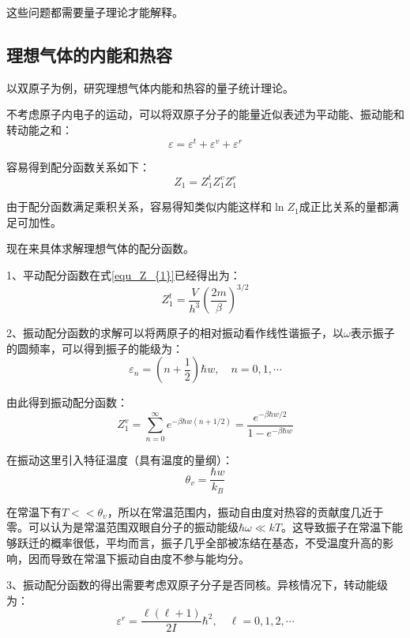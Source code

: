\documentclass[UTF8]{ctexart}
\begin{document}
	这些问题都需要量子理论才能解释。
	
	\subsection{理想气体的内能和热容}
	以双原子为例，研究理想气体内能和热容的量子统计理论。
	
	不考虑原子内电子的运动，可以将双原子分子的能量近似表述为平动能、振动能和转动能之和：
	\begin{equation}
		\varepsilon=\varepsilon^{t}+\varepsilon^{v}+\varepsilon^{r}
	\end{equation}
	
\noindent 容易得到配分函数关系如下：
\begin{equation}
Z_{1}=Z_{1}^{t} Z_{1}^{v} Z_{1}^{r}
\end{equation}

\noindent 由于配分函数满足乘积关系，容易得知类似内能这样和$ \ln Z_{1} $成正比关系的量都满足可加性。

	现在来具体求解理想气体的配分函数。
	
	1、平动配分函数在式\ref{equ_Z_{1}}已经得出为：
	$$
	Z_{1}^{t}=\frac{V}{h^{3}}\left(\frac{2 m}{\beta}\right)^{3 / 2}
	$$
	
	2、振动配分函数的求解可以将两原子的相对振动看作线性谐振子，以$ \omega $表示振子的圆频率，可以得到振子的能级为：
	\begin{equation}
	\varepsilon_{n}=\left(n+\frac{1}{2}\right) \hbar w, \quad n=0,1, \cdots
	\end{equation}
	
\noindent 由此得到振动配分函数：
\begin{equation}
Z_{1}^{v}=\sum_{n=0}^{\infty} e^{-\beta \hbar w(n+1 / 2)}=\frac{e^{-\beta \hbar w / 2}}{1-e^{-\beta \hbar w}}
\end{equation}

	在振动这里引入特征温度（具有温度的量纲）：
	\begin{equation}
	\theta_{v}=\frac{\hbar w}{k_{B}}
	\end{equation}
	
	在常温下有$ T<<\theta_{v} $，所以在常温范围内，振动自由度对热容的贡献度几近于零。可以认为是常温范围双眼自分子的振动能级$ \hbar \omega \ll k T $。这导致振子在常温下能够跃迁的概率很低，平均而言，振子几乎全部被冻结在基态，不受温度升高的影响，因而导致在常温下振动自由度不参与能均分。
	
	3、振动配分函数的得出需要考虑双原子分子是否同核。异核情况下，转动能级为：
	\begin{equation}
	\varepsilon^{r}=\frac{\ell(\ell+1)}{2 I} \hbar^{2}, \quad \ell=0,1,2, \cdots
	\end{equation}
	
\end{document}
